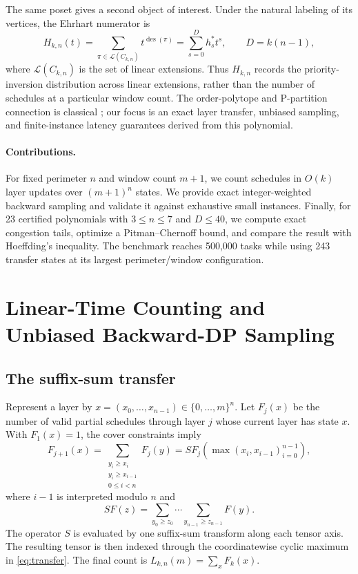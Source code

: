 \documentclass[10pt]{article}
\newcommand{\Lcal}{\mathcal{L}}
\newcommand{\des}{\operatorname{des}}
\begin{document}
The same poset gives a second object of interest. Under the natural labeling of its vertices, the Ehrhart numerator is
\begin{equation}
  H_{k,n}(t)=\sum_{\pi\in\Lcal(C_{k,n})}t^{\des(\pi)}
            =\sum_{s=0}^{D}h_s^*t^s,\qquad
  D=k(n-1),
  \label{eq:hstar}
\end{equation}
where $\Lcal(C_{k,n})$ is the set of linear extensions. Thus $H_{k,n}$ records the priority-inversion distribution across linear extensions, rather than the number of schedules at a particular window count. The order-polytope and P-partition connection is classical \cite{Stanley1986}; our focus is an exact layer transfer, unbiased sampling, and finite-instance latency guarantees derived from this polynomial.

\paragraph{Contributions.}
For fixed perimeter $n$ and window count $m+1$, we count schedules in $O(k)$ layer updates over $(m+1)^n$ states. We provide exact integer-weighted backward sampling and validate it against exhaustive small instances. Finally, for 23 certified polynomials with $3\le n\le7$ and $D\le40$, we compute exact congestion tails, optimize a Pitman--Chernoff bound, and compare the result with Hoeffding's inequality. The benchmark reaches 500,000 tasks while using 243 transfer states at its largest perimeter/window configuration.

\section{Linear-Time Counting and Unbiased Backward-DP Sampling}

\subsection{The suffix-sum transfer}

Represent a layer by $x=(x_0,\ldots,x_{n-1})\in\{0,\ldots,m\}^n$. Let $F_j(x)$ be the number of valid partial schedules through layer $j$ whose current layer has state $x$. With $F_1(x)=1$, the cover constraints imply
\begin{equation}
  F_{j+1}(x)
  =\sum_{\substack{y_i\ge x_i\\y_i\ge x_{i-1}\\0\le i<n}}F_j(y)
  =S F_j\!\left(\max(x_i,x_{i-1})_{i=0}^{n-1}\right),
  \label{eq:transfer}
\end{equation}
where $i-1$ is interpreted modulo $n$ and
\[
  S F(z)=\sum_{y_0\ge z_0}\cdots\sum_{y_{n-1}\ge z_{n-1}}F(y).
\]
The operator $S$ is evaluated by one suffix-sum transform along each tensor axis. The resulting tensor is then indexed through the coordinatewise cyclic maximum in \eqref{eq:transfer}. The final count is $L_{k,n}(m)=\sum_x F_k(x)$.
\end{document}
